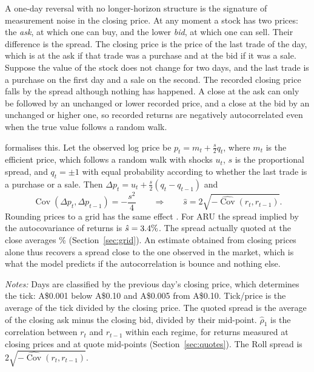 \documentclass[11pt,a4paper]{article}
\newcommand{\Cov}{\operatorname{Cov}}
\newcommand{\tabnote}[1]{\par\vspace{5pt}\begin{minipage}{\linewidth}\setstretch{1.0}\footnotesize\textit{Notes:} #1\end{minipage}}
\begin{document}
A one-day reversal with no longer-horizon structure is the signature of measurement noise in the closing price. At any moment a stock has two prices: the \emph{ask}, at which one can buy, and the lower \emph{bid}, at which one can sell. Their difference is the spread. The closing price is the price of the last trade of the day, which is at the ask if that trade was a purchase and at the bid if it was a sale. Suppose the value of the stock does not change for two days, and the last trade is a purchase on the first day and a sale on the second. The recorded closing price falls by the spread although nothing has happened. A close at the ask can only be followed by an unchanged or lower recorded price, and a close at the bid by an unchanged or higher one, so recorded returns are negatively autocorrelated even when the true value follows a random walk.

\citet{roll1984} formalises this. Let the observed log price be $p_t=m_t+\tfrac{s}{2}q_t$, where $m_t$ is the efficient price, which follows a random walk with shocks $u_t$, $s$ is the proportional spread, and $q_t=\pm1$ with equal probability according to whether the last trade is a purchase or a sale. Then $\Delta p_t=u_t+\tfrac{s}{2}(q_t-q_{t-1})$ and
\begin{equation}
\Cov(\Delta p_t,\Delta p_{t-1})=-\frac{s^{2}}{4}\qquad\Longrightarrow\qquad \hat s=2\sqrt{-\widehat{\Cov}(r_t,r_{t-1})} .
\end{equation}
Rounding prices to a grid has the same effect \citep{gottliebkalay1985,harris1990}. For ARU the spread implied by the autocovariance of returns is $\hat s=3.4\%$. The spread actually quoted at the close averages \qSpread\% (Section~\ref{sec:grid}). An estimate obtained from closing prices alone thus recovers a spread close to the one observed in the market, which is what the model predicts if the autocorrelation is bounce and nothing else.

\begin{table}[t]
\centering
\caption{Autocorrelation and bid--ask spread by tick-size regime}\label{tab:tick}
\small

\tabnote{Days are classified by the previous day's closing price, which determines the tick: A\$0.001 below A\$0.10 and A\$0.005 from A\$0.10. Tick/price is the average of the tick divided by the closing price. The quoted spread is the average of the closing ask minus the closing bid, divided by their mid-point. $\hat\rho_1$ is the correlation between $r_t$ and $r_{t-1}$ within each regime, for returns measured at closing prices and at quote mid-points (Section~\ref{sec:quotes}). The Roll spread is $2\sqrt{-\widehat{\Cov}(r_t,r_{t-1})}$.}
\end{table}
\end{document}
